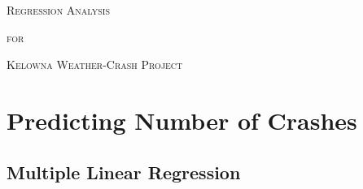 \documentclass[11pt, a4paper]{article}
\begin{document}


\begin{center}
\Large{\textsc{Regression Analysis}}
\par
\normalsize{\textsc{for}}
\par
\large{\textsc{Kelowna Weather-Crash Project}}
\end{center}


\vspace{0.917 pc} %

\tableofcontents



\pagebreak
\section{Predicting Number of Crashes}





\subsection{Multiple Linear Regression}
\end{document}
